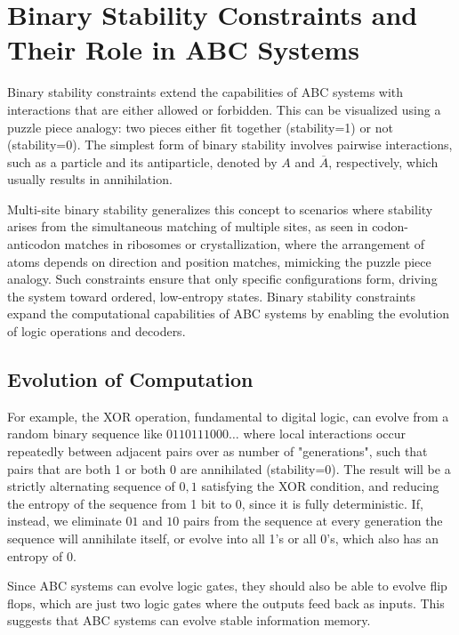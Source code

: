 \documentclass[entropy,article,submit,pdftex,moreauthors]{Definitions/mdpi}
\begin{document}
\section{Binary Stability Constraints and Their Role in ABC Systems}

Binary stability constraints extend the capabilities of ABC systems with interactions that are either allowed or forbidden. This can be visualized using a puzzle piece analogy: two pieces either fit together (stability=1) or not (stability=0). The simplest form of binary stability involves pairwise interactions, such as a particle and its antiparticle, denoted by \( A \) and \( \overline{A} \), respectively, which usually results in annihilation. 

Multi-site binary stability generalizes this concept to scenarios where stability arises from the simultaneous matching of multiple sites, as seen in codon-anticodon matches in ribosomes or crystallization, where the arrangement of atoms depends on direction and position matches, mimicking the puzzle piece analogy. Such constraints ensure that only specific configurations form, driving the system toward ordered, low-entropy states. Binary stability constraints expand the computational capabilities of ABC systems by enabling the evolution of logic operations and decoders. 

\subsection{Evolution of Computation}

For example, the XOR operation, fundamental to digital logic, can evolve from a random binary sequence  like \( 0110111000\dots \) where local interactions occur repeatedly between adjacent pairs over as number of "generations", such that pairs that are both 1 or both 0 are annihilated (stability=0). The result will be a strictly alternating sequence of \( 0, 1 \) satisfying the XOR condition, and reducing the entropy of the sequence from 1 bit to 0, since it is fully deterministic. If, instead, we eliminate \( 01 \) and \( 10 \) pairs from the sequence at every generation the sequence will annihilate itself, or evolve into all 1's or all 0's, which also has an entropy of 0.

Since ABC systems can evolve logic gates, they should also be able to evolve flip flops, which are just two logic gates where the outputs feed back as inputs. This suggests that ABC systems can evolve stable information memory.
\end{document}
